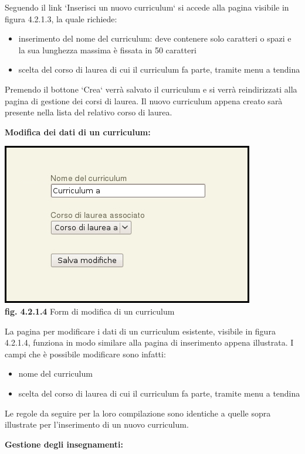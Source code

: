 \documentclass[11pt,a4paper]{article}
\begin{document}
Seguendo il link `Inserisci un nuovo curriculum` si accede alla pagina visibile in figura 4.2.1.3, la quale richiede:
\begin{itemize}
 \item inserimento del nome del curriculum: deve contenere solo caratteri o spazi e la sua lunghezza massima è fissata in 50 caratteri
 \item scelta del corso di laurea di cui il curriculum fa parte, tramite menu a tendina
\end{itemize}
Premendo il bottone `Crea` verrà salvato il curriculum e si verrà reindirizzati alla pagina di gestione dei corsi di laurea. Il nuovo curriculum appena creato sarà presente nella lista del relativo corso di laurea.
\newline \newline
\begin{large}\textbf{Modifica dei dati di un curriculum:}\end{large}

\bigskip
\begin{center}
	\includegraphics[scale=0.5]{images/modifica_curriculum.jpg}\\
	\textbf{fig. 4.2.1.4} Form di modifica di un curriculum\\
\end{center}
\bigskip

La pagina per modificare i dati di un curriculum esistente, visibile in figura 4.2.1.4, funziona in modo similare alla pagina di inserimento appena illustrata. I campi che è possibile modificare sono infatti:
\begin{itemize}
 \item nome del curriculum
 \item scelta del corso di laurea di cui il curriculum fa parte, tramite menu a tendina
\end{itemize}
Le regole da seguire per la loro compilazione sono identiche a quelle sopra illustrate per l'inserimento di un nuovo curriculum.
\newline \newline
\begin{large}\textbf{Gestione degli insegnamenti:}\end{large}
\end{document}
